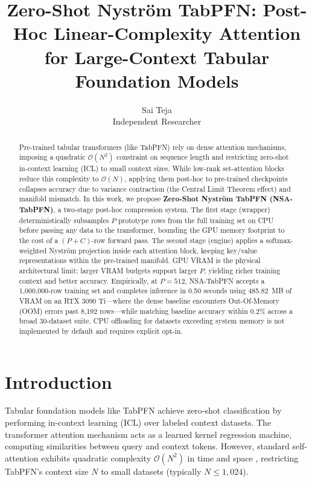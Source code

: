 \documentclass{article} %
\title{Zero-Shot Nystr\"om TabPFN: Post-Hoc Linear-Complexity Attention \\ for Large-Context Tabular Foundation Models}
\author{\name Sai Teja \\
      \addr 
      Independent Researcher}
\begin{document}
\maketitle

\begin{abstract}
Pre-trained tabular transformers (like TabPFN) rely on dense attention mechanisms, imposing a quadratic $\mathcal{O}(N^2)$ constraint on sequence length and restricting zero-shot in-context learning (ICL) to small context sizes. While low-rank set-attention blocks reduce this complexity to $\mathcal{O}(N)$, applying them post-hoc to pre-trained checkpoints collapses accuracy due to variance contraction (the Central Limit Theorem effect) and manifold mismatch. In this work, we propose \textbf{Zero-Shot Nystr\"om TabPFN (NSA-TabPFN)}, a two-stage post-hoc compression system. The first stage (wrapper) deterministically subsamples $P$ prototype rows from the full training set on CPU before passing any data to the transformer, bounding the GPU memory footprint to the cost of a $(P + C)$-row forward pass. The second stage (engine) applies a softmax-weighted Nystr\"om projection inside each attention block, keeping key/value representations within the pre-trained manifold. GPU VRAM is the physical architectural limit: larger VRAM budgets support larger $P$, yielding richer training context and better accuracy. Empirically, at $P = 512$, NSA-TabPFN accepts a 1,000,000-row training set and completes inference in 0.50 seconds using 485.82~MB of VRAM on an RTX 3090 Ti---where the dense baseline encounters Out-Of-Memory (OOM) errors past 8,192 rows---while matching baseline accuracy within 0.2\% across a broad 30-dataset suite. CPU offloading for datasets exceeding system memory is not implemented by default and requires explicit opt-in.
\end{abstract}

\section{Introduction}

Tabular foundation models like TabPFN \citep{hollmann2022tabpfn} achieve zero-shot classification by performing in-context learning (ICL) over labeled context datasets. The transformer attention mechanism acts as a learned kernel regression machine, computing similarities between query and context tokens. However, standard self-attention exhibits quadratic complexity $\mathcal{O}(N^2)$ in time and space \citep{vaswani2017attention}, restricting TabPFN's context size $N$ to small datasets (typically $N \le 1,024$).
\end{document}
